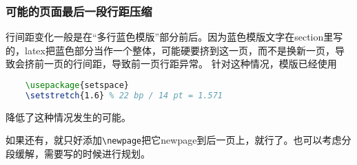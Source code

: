 

\subsubsection{可能的页面最后一段行距压缩}

行间距变化一般是在“多行蓝色模版”部分前后。因为蓝色模版文字在section里写的，latex把蓝色部分当作一个整体，可能硬要挤到这一页，而不是换新一页，导致会挤前一页的行间距，导致前一页行距异常。
针对这种情况，模版已经使用
\begin{lstlisting}[language=tex, basicstyle=\ttfamily\small, keywordstyle=\color{blue}, commentstyle=\color{gray}]
	%自动段落的行间距微调
	\usepackage{setspace}
	\setstretch{1.6} % 22 bp / 14 pt = 1.571
\end{lstlisting}
降低了这种情况发生的可能。

如果还有，就只好添加\verb|\newpage|把它newpage到后一页上，就行了。也可以考虑分段缓解，需要写的时候进行规划。

